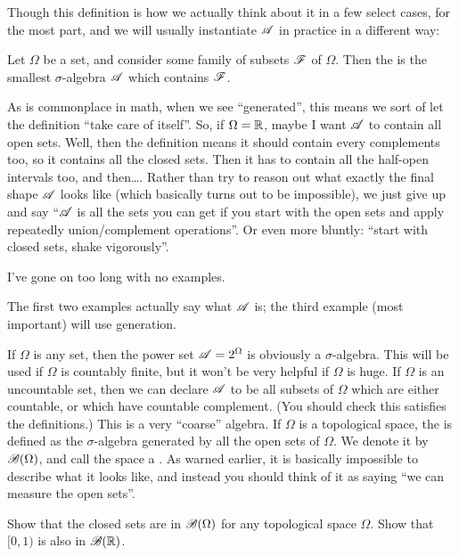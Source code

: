 Though this definition is how we actually think about it in a few select cases,
for the most part, and we will usually instantiate $\mathscr A$ in practice
in a different way:
\begin{definition}
	Let $\Omega$ be a set, and consider some family of subsets $\mathscr F$ of $\Omega$.
	Then the 
	is the smallest $\sigma$-algebra $\mathscr A$ which contains $\mathscr F$.
\end{definition}
As is commonplace in math, when we see ``generated'',
this means we sort of let the definition ``take care of itself''.
So, if $\Omega = \mathbb R$, maybe I want $\mathscr A$ to contain all open sets.
Well, then the definition means it should contain every complements too,
so it contains all the closed sets.
Then it has to contain all the half-open intervals too, and then\dots.
Rather than try to reason out what exactly the final shape $\mathscr A$ looks like
(which basically turns out to be impossible),
we just give up and say ``$\mathscr A$ is all the sets you can get if you start
with the open sets and apply repeatedly union/complement operations''.
Or even more bluntly: ``start with closed sets, shake vigorously''.

I've gone on too long with no examples.
\begin{example}
	The first two examples actually say what $\mathscr A$ is;
	the third example (most important) will use generation.
	\begin{enumerate}[(a)]
		\ii If $\Omega$ is any set,
		then the power set $\mathscr A = 2^{\Omega}$ is obviously a $\sigma$-algebra.
		This will be used if $\Omega$ is countably finite,
		but it won't be very helpful if $\Omega$ is huge.
		\ii If $\Omega$ is an uncountable set,
		then we can declare $\mathscr A$ to be all subsets of $\Omega$
		which are either countable,
		or which have countable complement.
		(You should check this satisfies the definitions.)
		This is a very ``coarse'' algebra.
		\ii If $\Omega$ is a topological space,
		the 
		is defined as the $\sigma$-algebra generated by all the open sets of $\Omega$.
		We denote it by $\mathscr B(\Omega)$,
		and call the space a .
		As warned earlier, it is basically impossible to describe
		what it looks like,
		and instead you should think of it as saying
		``we can measure the open sets''.
	\end{enumerate}
\end{example}
\begin{ques}
	Show that the closed sets are in $\mathscr B(\Omega)$ for
	any topological space $\Omega$.
	Show that $[0,1)$ %
	is also in $\mathscr B(\mathbb R)$.
\end{ques}

